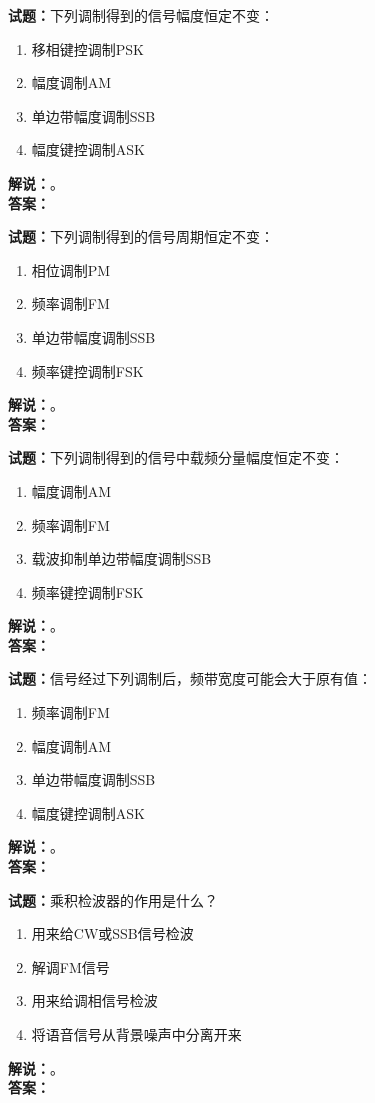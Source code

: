 \documentclass{ctexbook}
\begin{document}
\noindent\textbf{试题：}下列调制得到的信号幅度恒定不变：
\begin{enumerate}[leftmargin=3em]
  \item 移相键控调制PSK
  \item 幅度调制AM
  \item 单边带幅度调制SSB
  \item 幅度键控调制ASK
\end{enumerate}
\noindent\textbf{解说：}\textbf{}。\\\noindent\textbf{答案：}

\bigskip

\noindent\textbf{试题：}下列调制得到的信号周期恒定不变：
\begin{enumerate}[leftmargin=3em]
  \item 相位调制PM
  \item 频率调制FM
  \item 单边带幅度调制SSB
  \item 频率键控调制FSK
\end{enumerate}
\noindent\textbf{解说：}\textbf{}。\\\noindent\textbf{答案：}

\bigskip

\noindent\textbf{试题：}下列调制得到的信号中载频分量幅度恒定不变：
\begin{enumerate}[leftmargin=3em]
  \item 幅度调制AM
  \item 频率调制FM
  \item 载波抑制单边带幅度调制SSB
  \item 频率键控调制FSK
\end{enumerate}
\noindent\textbf{解说：}\textbf{}。\\\noindent\textbf{答案：}

\bigskip

\noindent\textbf{试题：}信号经过下列调制后，频带宽度可能会大于原有值：
\begin{enumerate}[leftmargin=3em]
  \item 频率调制FM
  \item 幅度调制AM
  \item 单边带幅度调制SSB
  \item 幅度键控调制ASK
\end{enumerate}
\noindent\textbf{解说：}\textbf{}。\\\noindent\textbf{答案：}

\bigskip

\noindent\textbf{试题：}乘积检波器的作用是什么？
\begin{enumerate}[leftmargin=3em]
  \item 用来给CW或SSB信号检波
  \item 解调FM信号
  \item 用来给调相信号检波
  \item 将语音信号从背景噪声中分离开来
\end{enumerate}
\noindent\textbf{解说：}\textbf{}。\\\noindent\textbf{答案：}
\end{document}
